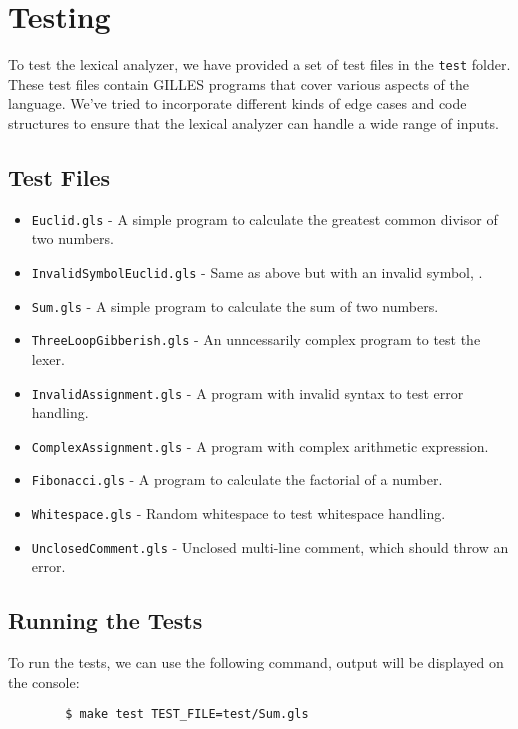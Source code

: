 \chapter{Testing}
    To test the lexical analyzer, we have provided a set of test files in the \texttt{test} folder. These test files contain GILLES programs that cover various aspects of the language.
	We've tried to incorporate different kinds of edge cases and code structures to ensure that the lexical analyzer can handle a wide range of inputs.
	\section{Test Files}
	\begin{itemize}
		\item \texttt{Euclid.gls} - A simple program to calculate the greatest common divisor of two numbers.
		\item \texttt{InvalidSymbolEuclid.gls} - Same as above but with an invalid symbol, .
		\item \texttt{Sum.gls} - A simple program to calculate the sum of two numbers.
		\item \texttt{ThreeLoopGibberish.gls} - An unncessarily complex program to test the lexer.
		\item \texttt{InvalidAssignment.gls} - A program with invalid syntax to test error handling.
		\item \texttt{ComplexAssignment.gls} - A program with complex arithmetic expression.
		\item \texttt{Fibonacci.gls} - A program to calculate the factorial of a number.
		\item \texttt{Whitespace.gls} - Random whitespace to test whitespace handling.
            \item \texttt{UnclosedComment.gls} - Unclosed multi-line comment, which should throw an error.
	\end{itemize}

	\section{Running the Tests}
	To run the tests, we can use the following command, output will be displayed on the console:
	\begin{verbatim}
		$ make test TEST_FILE=test/Sum.gls
    \end{verbatim}
  
